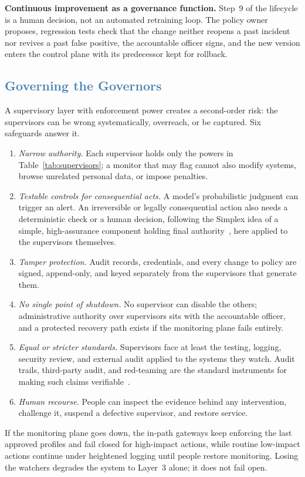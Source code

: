 \documentclass[journal]{IEEEtran}
\begin{document}
\textbf{Continuous improvement as a governance function.} Step~9 of the lifecycle is a human decision, not an automated retraining loop. The policy owner proposes, regression tests check that the change neither reopens a past incident nor revives a past false positive, the accountable officer signs, and the new version enters the control plane with its predecessor kept for rollback.

\subsection{\textcolor{steelblue}{Governing the Governors}}
\label{sec:hacof-governors}

A supervisory layer with enforcement power creates a second-order risk: the supervisors can be wrong systematically, overreach, or be captured. Six safeguards answer it.
\begin{enumerate}
  \item \textit{Narrow authority.} Each supervisor holds only the powers in Table~\ref{tab:supervisors}; a monitor that may flag cannot also modify systems, browse unrelated personal data, or impose penalties.
  \item \textit{Testable controls for consequential acts.} A model's probabilistic judgment can trigger an alert. An irreversible or legally consequential action also needs a deterministic check or a human decision, following the Simplex idea of a simple, high-assurance component holding final authority~\cite{sha2001simplex}, here applied to the supervisors themselves.
  \item \textit{Tamper protection.} Audit records, credentials, and every change to policy are signed, append-only, and keyed separately from the supervisors that generate them.
  \item \textit{No single point of shutdown.} No supervisor can disable the others; administrative authority over supervisors sits with the accountable officer, and a protected recovery path exists if the monitoring plane fails entirely.
  \item \textit{Equal or stricter standards.} Supervisors face at least the testing, logging, security review, and external audit applied to the systems they watch. Audit trails, third-party audit, and red-teaming are the standard instruments for making such claims verifiable~\cite{brundage2020trustworthy}.
  \item \textit{Human recourse.} People can inspect the evidence behind any intervention, challenge it, suspend a defective supervisor, and restore service.
\end{enumerate}
If the monitoring plane goes down, the in-path gateways keep enforcing the last approved profiles and fail closed for high-impact actions, while routine low-impact actions continue under heightened logging until people restore monitoring. Losing the watchers degrades the system to Layer~3 alone; it does not fail open.
\end{document}
